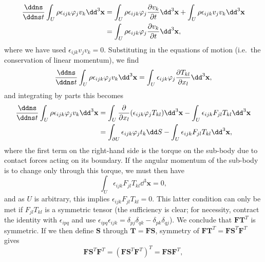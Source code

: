 \documentclass[a4paper,10pt]{paper}
\begin{document}
\begin{enumerate}
\begin{enumerate}
\begin{align*}
    \frac{\ddns}{\ddns t}\int_{U}\rho\epsilon_{ijk}\varphi_{j}v_{k}\dd^{3}\mathbf{x} &= \int_{U}\rho\epsilon_{ijk}\varphi_{j}\frac{\partial v_{k}}{\partial t}\dd^{3}\mathbf{x}+\int_{U}\rho\epsilon_{ijk}v_{j}v_{k}\dd^{3}\mathbf{x} \\
    &= \int_{U}\rho\epsilon_{ijk}\varphi_{j}\frac{\partial v_{k}}{\partial t}\dd^{3}\mathbf{x},
\end{align*}
where we have used $\epsilon_{ijk}v_{j}v_{k}=0$. Substituting in the equations of motion (i.e.\ the conservation of linear momentum), we find
\begin{equation*}
    \frac{\ddns}{\ddns t}\int_{U}\rho\epsilon_{ijk}\varphi_{j}v_{k}\dd^{3}\mathbf{x}=\int_{U}\epsilon_{ijk}\varphi_{j}\frac{\partial T_{kl}}{\partial x_{l}}\dd^{3}\mathbf{x},
\end{equation*}
and integrating by parts this becomes
\begin{align*}
    \frac{\ddns}{\ddns t}\int_{U}\rho\epsilon_{ijk}\varphi_{j}v_{k}\dd^{3}\mathbf{x} &= \int_{U}\frac{\partial}{\partial x_{l}}(\epsilon_{ijk}\varphi_{j}T_{kl})\dd^{3}\mathbf{x}-\int_{U}\epsilon_{ijk}F_{jl}T_{kl}\dd^{3}\mathbf{x} \\
    &= \int_{\partial U}\epsilon_{ijk}\varphi_{j}t_{k}\dd S-\int_{U}\epsilon_{ijk}F_{jl}T_{kl}\dd^{3}\mathbf{x},
\end{align*}
where the first term on the right-hand side is the torque on the sub-body due to contact forces acting on its boundary. If the angular momentum of the sub-body is to change only through this torque, we must then have
\begin{equation*}
    \int_{U}\epsilon_{ijk}F_{jl}T_{kl}\dd^{3}\mathbf{x}=0,
\end{equation*}
and as $U$ is arbitrary, this implies $\epsilon_{ijk}F_{jl}T_{kl}=0$. This latter condition can only be met if $F_{jl}T_{kl}$ is a symmetric tensor (the sufficiency is clear; for necessity, contract the identity with $\epsilon_{ipq}$ and use $\epsilon_{ipq}\epsilon_{ijk}=\delta_{pj}\delta_{qk}-\delta_{pk}\delta_{qj}$). We conclude that $\mathbf{F}\mathbf{T}^{T}$ is symmetric. If we then define $\mathbf{S}$ through $\mathbf{T}=\mathbf{F}\mathbf{S}$, symmetry of $\mathbf{F}\mathbf{T}^{T}=\mathbf{F}\mathbf{S}^{T}\mathbf{F}^{T}$ gives
\begin{equation*}
    \mathbf{F}\mathbf{S}^{T}\mathbf{F}^{T}=(\mathbf{F}\mathbf{S}^{T}\mathbf{F}^{T})^{T}=\mathbf{F}\mathbf{S}\mathbf{F}^{T},
\end{equation*}

\end{enumerate}
\end{enumerate}
\end{document}
